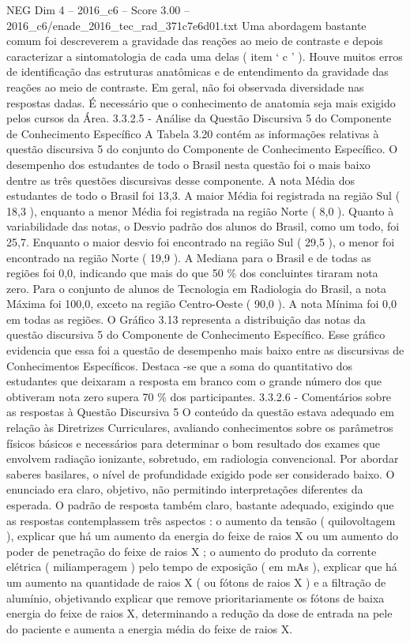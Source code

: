 \begin{textsample}{NEG Dim 4 – 2016\_c6 – Score 3.00 – 2016\_c6/enade\_2016\_tec\_rad\_371c7e6d01.txt}
Uma abordagem bastante comum foi descreverem a gravidade das reações ao meio de contraste e depois caracterizar a sintomatologia de cada uma delas ( item ‘ c ’ ).
Houve muitos erros de identificação das estruturas anatômicas e de entendimento da gravidade das reações ao meio de contraste.
Em geral, não foi observada diversidade nas respostas dadas.
É necessário que o conhecimento de anatomia seja mais exigido pelos cursos da Área. 3.3.2.5 - Análise da Questão Discursiva 5 do Componente de Conhecimento Específico A Tabela 3.20 contém as informações relativas à questão discursiva 5 do conjunto do Componente de Conhecimento Específico.
O desempenho dos estudantes de todo o Brasil nesta questão foi o mais baixo dentre as três questões discursivas desse componente.
A nota Média dos estudantes de todo o Brasil foi 13,3.
A maior Média foi registrada na região Sul ( 18,3 ), enquanto a menor Média foi registrada na região Norte ( 8,0 ).
Quanto à variabilidade das notas, o Desvio padrão dos alunos do Brasil, como um todo, foi 25,7.
Enquanto o maior desvio foi encontrado na região Sul ( 29,5 ), o menor foi encontrado na região Norte ( 19,9 ).
A Mediana para o Brasil e de todas as regiões foi 0,0, indicando que mais do que 50 \% dos concluintes tiraram nota zero.
Para o conjunto de alunos de Tecnologia em Radiologia do Brasil, a nota Máxima foi 100,0, exceto na região Centro-Oeste ( 90,0 ).
A nota Mínima foi 0,0 em todas as regiões.
O Gráfico 3.13 representa a distribuição das notas da questão discursiva 5 do Componente de Conhecimento Específico.
Esse gráfico evidencia que essa foi a questão de desempenho mais baixo entre as discursivas de Conhecimentos Específicos.
Destaca -se que a soma do quantitativo dos estudantes que deixaram a resposta em branco com o grande número dos que obtiveram nota zero supera 70 \% dos participantes. 3.3.2.6 - Comentários sobre as respostas à Questão Discursiva 5 O conteúdo da questão estava adequado em relação às Diretrizes Curriculares, avaliando conhecimentos sobre os parâmetros físicos básicos e necessários para determinar o bom resultado dos exames que envolvem radiação ionizante, sobretudo, em radiologia convencional.
Por abordar saberes basilares, o nível de profundidade exigido pode ser considerado baixo.
O enunciado era claro, objetivo, não permitindo interpretações diferentes da esperada.
O padrão de resposta também claro, bastante adequado, exigindo que as respostas contemplassem três aspectos : o aumento da tensão ( quilovoltagem ), explicar que há um aumento da energia do feixe de raios X ou um aumento do poder de penetração do feixe de raios X ; o aumento do produto da corrente elétrica ( miliamperagem ) pelo tempo de exposição ( em mAs ), explicar que há um aumento na quantidade de raios X ( ou fótons de raios X ) e a filtração de alumínio, objetivando explicar que remove prioritariamente os fótons de baixa energia do feixe de raios X, determinando a redução da dose de entrada na pele do paciente e aumenta a energia média do feixe de raios X.

\end{textsample}
